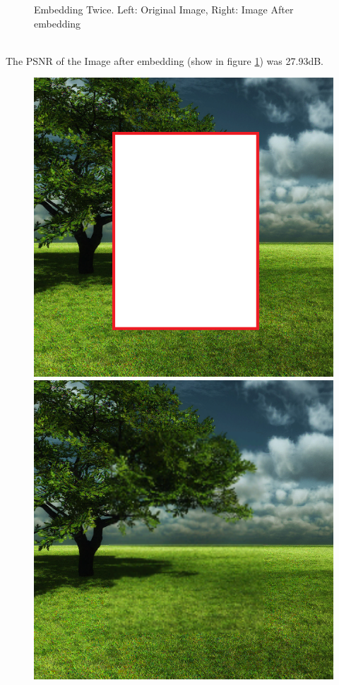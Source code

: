 \documentclass[12pt]{article}
\begin{document}
\begin{figure}[h]
{}%
\caption{Embedding Twice. Left: Original Image, Right: Image After embedding}
\label{fig:treeEmbedTwiceEmbedding}
\end{figure}

\hspace{0pt} \\
The PSNR of the Image after embedding (show in figure \ref{fig:treeEmbedTwiceEmbedding}) was 27.93dB.

\begin{figure}[h]
\centerline{%
\includegraphics[scale=0.45]{"Tree Embed twice 0.8 threshold/finalImage - Copy"}%
\hspace{0.1cm}
\includegraphics[scale=0.45]{"Tree Embed twice 0.8 threshold/finalImageAfterRestoration"}%
}
\end{figure}
\end{document}
